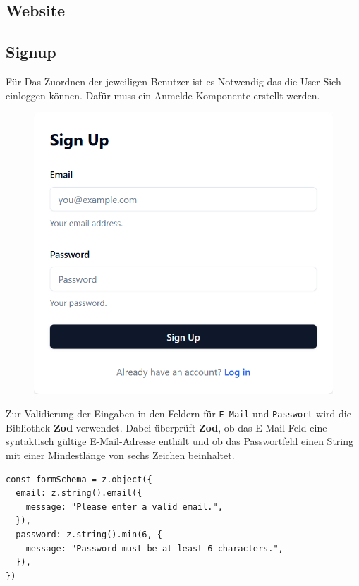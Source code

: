 \begin{inhalt}
\renewcommand*\chapterpagestyle{scrheadings}
\chapter{Website}


\section{Signup}
\label{ref:Signup}
Für Das Zuordnen der jeweiligen Benutzer ist es Notwendig das die User Sich einloggen können. Dafür muss ein Anmelde Komponente erstellt werden.

\begin{figure}[!htb]
\centering
\includegraphics[width=1\textwidth]{files/Thomas/pics/Website/Signup/sign-up.png}
\caption[Bildbezeichnung für Abbildungsverzeichnis]{}
\label{fig:gehaeuse_internet_bild}
\end{figure}

Zur Validierung der Eingaben in den Feldern für \texttt{E-Mail} und \texttt{Passwort} wird die Bibliothek \textbf{Zod} verwendet. Dabei überprüft \textbf{Zod}, ob das E-Mail-Feld eine syntaktisch gültige E-Mail-Adresse enthält und ob das Passwortfeld einen String mit einer Mindestlänge von sechs Zeichen beinhaltet.


\begin{lstlisting}[style=mytsx]
const formSchema = z.object({
  email: z.string().email({
    message: "Please enter a valid email.",
  }),
  password: z.string().min(6, {
    message: "Password must be at least 6 characters.",
  }),
})
\end{lstlisting}


\end{inhalt}
